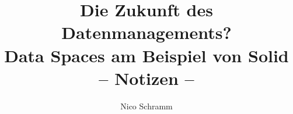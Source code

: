 
\title{\textbf{Die Zukunft des Datenmanagements?\\
       Data Spaces am Beispiel von Solid}\\
       \Large-- Notizen --}
\author{Nico Schramm}

\newcommand{\subject}{Handout zum Oberseminar-Vortrag}
